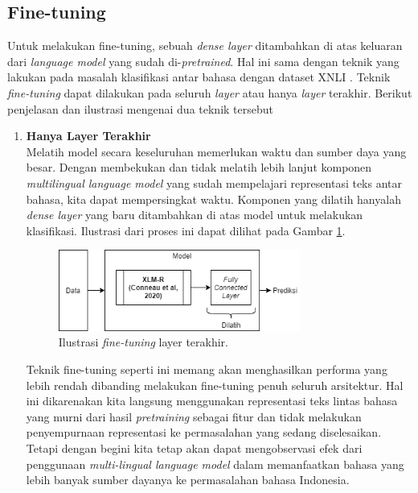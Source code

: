 	\subsection{Fine-tuning}
	Untuk melakukan fine-tuning, sebuah \textit{dense layer} ditambahkan di atas keluaran dari \textit{language model} yang sudah di-\textit{pretrained}. Hal ini sama dengan teknik yang \parencite{LampleConneau2019} lakukan pada masalah klasifikasi antar bahasa dengan dataset XNLI \parencite{Conneau_Rinott_Lample_Williams_Bowman_Schwenk_Stoyanov_2018}. Teknik \textit{fine-tuning} dapat dilakukan pada seluruh \textit{layer} atau hanya \textit{layer} terakhir. Berikut penjelasan dan ilustrasi mengenai dua teknik tersebut
	\begin{enumerate}
		\item \textbf{Hanya Layer Terakhir}\\	
		Melatih	model secara keseluruhan memerlukan waktu dan sumber daya yang besar. Dengan membekukan dan tidak melatih lebih lanjut komponen \textit{multilingual language model} yang sudah mempelajari representasi teks antar bahasa, kita dapat mempersingkat waktu. Komponen yang dilatih hanyalah \textit{dense layer} yang baru ditambahkan di atas model untuk melakukan klasifikasi. Ilustrasi dari proses ini dapat dilihat pada Gambar \ref{fig:ilustrasi_head_fine_tune}.
		\begin{figure}[h]
		    \centering
		    \includegraphics[width=0.75\textwidth]{resources/Head-fine-tune.png}
		    \caption{ Ilustrasi \textit{fine-tuning} layer terakhir.}
		    \label{fig:ilustrasi_head_fine_tune}
		\end{figure}

		Teknik fine-tuning seperti ini memang akan menghasilkan performa yang lebih rendah dibanding melakukan fine-tuning penuh seluruh arsitektur. Hal ini dikarenakan kita langsung menggunakan representasi teks lintas bahasa yang murni dari hasil \textit{pretraining} sebagai fitur dan tidak melakukan penyempurnaan representasi ke permasalahan yang sedang diselesaikan. Tetapi dengan begini kita tetap akan dapat mengobservasi efek dari penggunaan \textit{multi-lingual language model} dalam memanfaatkan bahasa yang lebih banyak sumber dayanya ke permasalahan bahasa Indonesia.


\end{enumerate}
